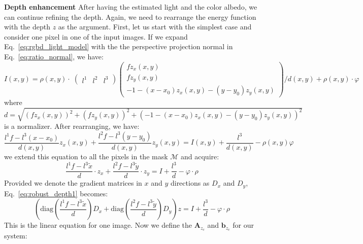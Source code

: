 \textbf{Depth enhancement}
After having the estimated light and the color albedo, we can continue refining the depth.
Again, we need to rearrange the energy function with the depth $z$ as the argument.
First, let us start with the simplest case and consider one pixel in one of the input images.
If we expand Eq.~\ref{eq:rgbd_light_model} with the the perspective projection normal in Eq.~\ref{eq:ratio_normal}, we have:
\begin{equation}
    I(x,y) = \rho(x,y) \cdot \; 
    \begin{pmatrix}
        l^1 & l^2 & l^3 
    \end{pmatrix}
     \begin{pmatrix}
         fz_x(x,y)\\
         fz_y(x,y)\\
         -1 - (x - x_0)z_x(x,y) - (y - y_0)z_y(x,y)
     \end{pmatrix}/ d(x,y)
     + \rho(x,y) \cdot \varphi   
\end{equation}
where $d = \sqrt{(fz_x(x,y))^2 + (fz_y(x,y))^2 + (-1 - (x - x_0)z_x(x,y) - (y - y_0)z_y(x,y))^2}$ is a normalizer.
After rearranging, we have:
\begin{equation}
    \frac{l^1f - l^3(x-x_0)}{d(x,y)}z_x(x,y) + \frac{l^2f - l^3(y-y_0)}{d(x,y)}z_y(x,y) = I(x,y) + \frac{l^3}{d(x,y)} - \rho(x,y)\varphi
\end{equation}
we extend this equation to all the pixels in the mask $\mathcal{M}$ and acquire:
\begin{equation}\label{eq:robust_depth1}
    \frac{l^1f - l^3\tilde{x}}{d} \cdot z_x + \frac{l^2f - l^3\tilde{y}}{d} \cdot z_y = I + \frac{l^3}{d} - \varphi \cdot \rho
\end{equation}
Provided we denote the gradient matrices in $x$ and $y$ directions as $D_x$ and $D_y$, Eq.~\ref{eq:robust_depth1} becomes:
\begin{equation}\label{eq:robust_depth2}
        \left(\text{diag}(\frac{l^1f - l^3\tilde{x}}{d}) D_x + \text{diag}(\frac{l^2f - l^3\tilde{y}}{d}) D_y\right) z = I + \frac{l^3}{d} - \varphi \cdot \rho
\end{equation}
This is the linear equation for one image. 
Now we define the $\mathbf{A}_{z_{c}}$ and $\mathbf{b}_{z_{c}}$ for our system:
